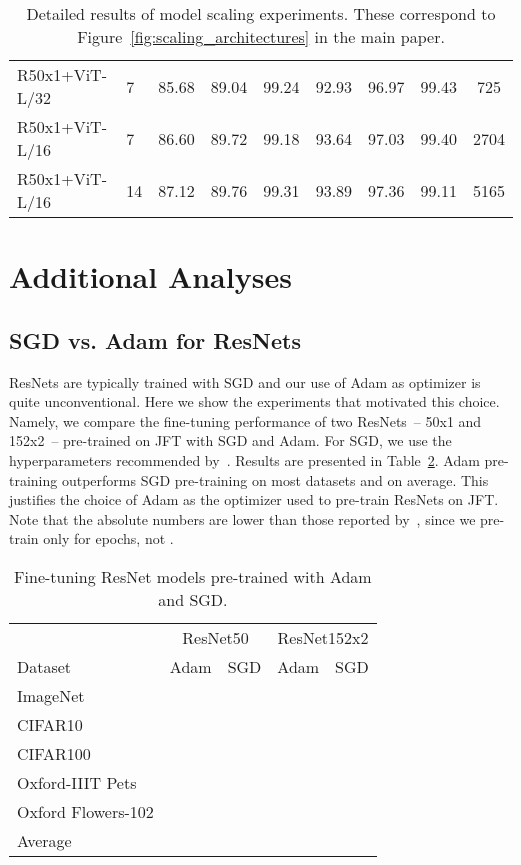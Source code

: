 \documentclass{article} \usepackage{iclr2021_conference,times}
\newcommand{\imagenet}{ImageNet\xspace}
\begin{document}
\begin{table}[]
{\begin{tabular}{llccccccc}
R50x1+ViT-L/32 &       7 &     85.68 &          89.04 &     99.24 &      92.93 & 96.97 &    99.43 &       725 \\
R50x1+ViT-L/16 &       7 &     86.60 &          89.72 &     99.18 &      93.64 & 97.03 &    99.40 &      2704 \\
R50x1+ViT-L/16 &      14 &     87.12 &          89.76 &     99.31 &      93.89 & 97.36 &    99.11 &      5165 \\
\bottomrule
\end{tabular}
}
\caption{Detailed results of model scaling experiments. These correspond to Figure~\ref{fig:scaling_architectures} in the main paper.}
\label{tbl:scaling_architectures}
\end{table}


\section{Additional Analyses}
\label{sec:additional_analyses}

\subsection{SGD vs. Adam for ResNets}
\label{sec:sgd_vs_adam}

ResNets are typically trained with SGD and our use of Adam as optimizer is quite unconventional.
Here we show the experiments that motivated this choice.
Namely, we compare the fine-tuning performance of two ResNets~-- 50x1 and 152x2~-- pre-trained on JFT with SGD and Adam.
For SGD, we use the hyperparameters recommended by~\citet{kolesnikov2020-bit}.
Results are presented in Table~\ref{tbl:resnet_adam_vs_sgd}.
Adam pre-training outperforms SGD pre-training on most datasets and on average.
This justifies the choice of Adam as the optimizer used to pre-train ResNets on JFT.
Note that the absolute numbers are lower than those reported by~\citet{kolesnikov2020-bit}, since we pre-train only for  epochs, not .

\begin{table}[t]
\centering
\small
\begin{tabular}{l c c c c}
\toprule
                   & \multicolumn{2}{c}{ResNet50} & \multicolumn{2}{c}{ResNet152x2}  \\
Dataset            & Adam       &  SGD            & Adam     &  SGD            \\
\midrule
\imagenet           &       &        &   &   \\
CIFAR10            &       &        &   &   \\
CIFAR100           &       &        &   &   \\
Oxford-IIIT Pets   &       &        &   &   \\
Oxford Flowers-102 &       &        &   &   \\
Average            &       &        &   &   \\
\bottomrule
\end{tabular}
\caption{Fine-tuning ResNet models pre-trained with Adam and SGD.}
\label{tbl:resnet_adam_vs_sgd}
\end{table}
\end{document}
